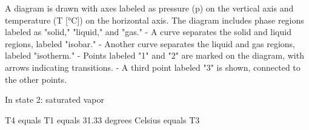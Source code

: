 A diagram is drawn with axes labeled as pressure (p) on the vertical axis and temperature (T [°C]) on the horizontal axis. The diagram includes phase regions labeled as "solid," "liquid," and "gas."  
- A curve separates the solid and liquid regions, labeled "isobar."  
- Another curve separates the liquid and gas regions, labeled "isotherm."  
- Points labeled "1" and "2" are marked on the diagram, with arrows indicating transitions.  
- A third point labeled "3" is shown, connected to the other points.

In state 2: saturated vapor  

T4 equals T1 equals 31.33 degrees Celsius equals T3